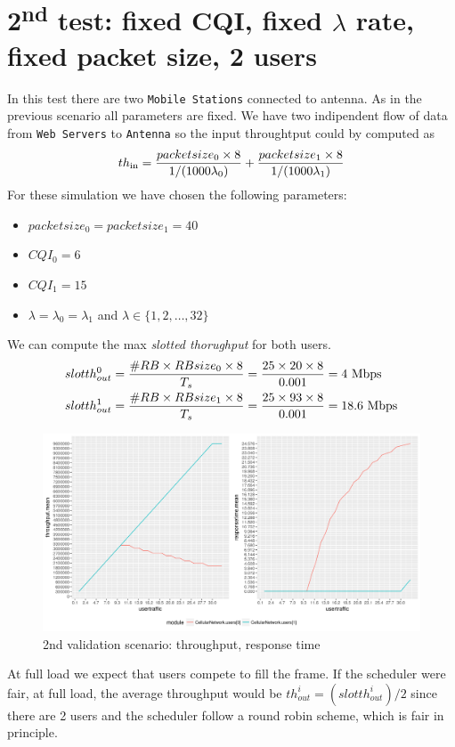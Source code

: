 \section{2\textsuperscript{nd} test: fixed CQI, fixed \(\lambda\) rate, fixed packet size, 2 users}\label{Validation-2}
In this test there are two \texttt{Mobile Stations} connected to antenna. As in the previous scenario all parameters are fixed. We have two indipendent flow of data from \texttt{Web Servers} to \texttt{Antenna} so the input throughtput could by computed as
\begin{equation} 
th\textsubscript{in} = \frac{packetsize\textsubscript{0} \times 8}{1/(1000\lambda\textsubscript{0})} + \frac{packetsize\textsubscript{1} \times 8}{1/(1000\lambda\textsubscript{1})}
\end{equation}
For these simulation we have chosen the following parameters:
\begin{itemize}
	\item \(packetsize_{0} = packetsize_{1} = 40\)
	\item \(CQI_{0} = 6\)
	\item \(CQI_{1} = 15\)
	\item \(\lambda = \lambda_{0} = \lambda_{1}\) and \(\lambda \in \{1,2,\ldots,32\}\)
\end{itemize}
We can compute the max \textit{slotted thorughput} for both users.
\begin{equation}
	\begin{split}
	slotth^{0}_{out} &= \frac{\#RB \times RBsize_{0} \times 8 }{T_s} = \frac{25 \times 20 \times 8}{0.001} = 4 \textnormal{ Mbps} \\ 
	slotth^{1}_{out} &= \frac{\#RB \times RBsize_{1} \times 8 }{T_s} = \frac{25 \times 93 \times 8}{0.001} = 18.6 \textnormal{ Mbps}
	\end{split}
\end{equation} 
\begin{figure}[H]
  \includegraphics[width=1\textwidth]{images/all-val2}
  \caption{2nd validation scenario: throughput, response time}
  \label{fig:2nd validation scenario: throughput, response time}
\end{figure}
At full load we expect that users compete to fill the frame. If the scheduler were fair, at full load, the average throughput would be \(th^{i}_{out} = (slotth^{i}_{out})/2\) since there are 2 users and the scheduler follow a round robin scheme, which is fair in principle. 

